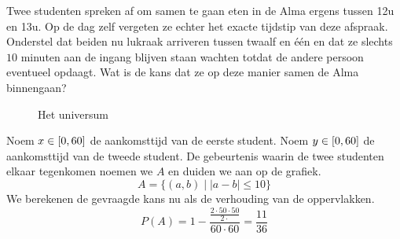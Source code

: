 \documentclass[main.tex]{subfiles}
\begin{document}
\begin{oef}
  Twee studenten spreken af om samen te gaan eten in de Alma ergens tussen 12u en 13u. Op
  de dag zelf vergeten ze echter het exacte tijdstip van deze afspraak. Onderstel dat beiden nu
  lukraak arriveren tussen twaalf en \'e\'en en dat ze slechts $10$ minuten aan de ingang blijven staan
  wachten totdat de andere persoon eventueel opdaagt. Wat is de kans dat ze op deze manier
  samen de Alma binnengaan?
  \begin{figure}[H]
    \centering
    \caption{Het universum}
  \end{figure}
  Noem $x\in \interval{0}{60}$ de aankomsttijd van de eerste student.
  Noem $y\in \interval{0}{60}$ de aankomsttijd van de tweede student.
  De gebeurtenis waarin de twee studenten elkaar tegenkomen noemen we $A$ en duiden we aan op de grafiek.
  \[ A = \{ (a,b) \mid |a-b| \le 10 \}\]
  We berekenen de gevraagde kans nu als de verhouding van de oppervlakken.
  \[ P(A) = 1 - \frac{\frac{2\cdot 50 \cdot 50 }{2 \cdot}}{60\cdot 60} = \frac{11}{36} \]
\end{oef}
\end{document}
